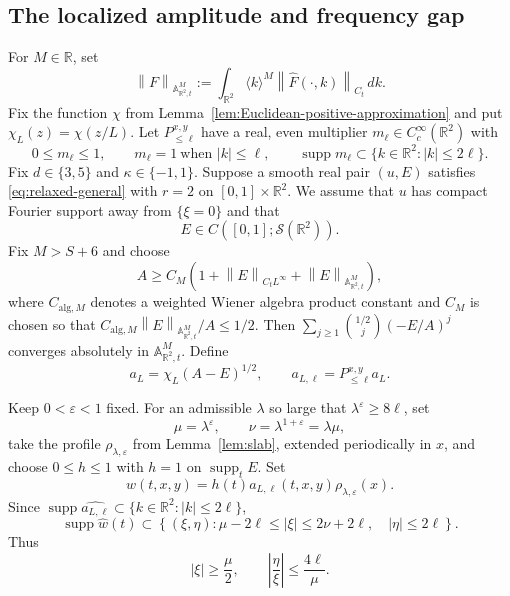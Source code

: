 \documentclass[12pt,reqno,letterpaper]{amsart}
\numberwithin{equation}{section}
\theoremstyle{definition}
\newcommand{\R}{\mathbb R}
\newcommand{\A}{\mathbb A}
\newcommand{\eps}{\varepsilon}
\newcommand{\la}{\lambda}
\newcommand{\supp}{\operatorname{supp}}
\newcommand{\norm}[1]{\left\lVert #1\right\rVert}
\newcommand{\abs}[1]{\left\lvert #1\right\rvert}
\begin{document}
\subsection{The localized amplitude and frequency gap}

For $M\in\R$, set
\[
    \norm{F}_{\A^M_{\R^2,t}}
    :=\int_{\R^2}\langle k\rangle^M
      \norm{\widehat F(\cdot,k)}_{C_t}\,dk.
\]
Fix the function $\chi$ from
Lemma~\ref{lem:Euclidean-positive-approximation} and put
$\chi_L(z)=\chi(z/L)$.
Let $P_{\leq\ell}^{x,y}$ have a real, even multiplier
$m_\ell\in C_c^\infty(\R^2)$ with
\begin{equation*}
    0\leq m_\ell\leq1,
    \qquad m_\ell=1\ \text{when }\abs k\leq\ell,
    \qquad \supp m_\ell\subset\{k\in\R^2:\abs k\leq2\ell\}.
\end{equation*}
Fix $d\in\{3,5\}$ and $\kappa\in\{-1,1\}$.  Suppose a smooth real pair
$(u,E)$ satisfies \eqref{eq:relaxed-general} with $r=2$
on $[0,1]\times\R^2$.  We assume that $u$ has compact Fourier support away
from $\{\xi=0\}$ and that
\[
    E\in C([0,1];\mathcal S(\R^2)).
\]
Fix $M>S+6$ and choose
\begin{equation}\label{eq:Euclidean-A-choice}
    A\geq C_M\left(1+\norm{E}_{C_tL^\infty}
                    +\norm{E}_{\A^M_{\R^2,t}}\right),
\end{equation}
where $C_{\mathrm{alg},M}$ denotes a weighted Wiener algebra product
constant and $C_M$ is chosen so that
$C_{\mathrm{alg},M}\norm{E}_{\A^M_{\R^2,t}}/A\leq1/2$.
Then
$\sum_{j\geq1}\binom{1/2}{j}(-E/A)^j$ converges absolutely in
$\A^M_{\R^2,t}$.  Define
\begin{equation}\label{eq:Euclidean-amplitude}
    a_L=\chi_L(A-E)^{1/2},
    \qquad a_{L,\ell}=P_{\leq\ell}^{x,y}a_L.
\end{equation}

Keep $0<\eps<1$ fixed.  For an admissible $\la$ so large that
$\la^\eps\geq8\ell$, set
\[
    \mu=\la^\eps,
    \qquad \nu=\la^{1+\eps}=\la\mu,
\]
take the profile $\rho_{\la,\eps}$ from Lemma~\ref{lem:slab}, extended
periodically in $x$, and choose $0\leq h\leq1$ with $h=1$ on
$\supp_tE$.  Set
\begin{equation}\label{eq:Euclidean-increment}
    w(t,x,y)=h(t)a_{L,\ell}(t,x,y)\rho_{\la,\eps}(x).
\end{equation}
Since $\supp\widehat{a_{L,\ell}}
\subset\{k\in\R^2:\abs k\leq2\ell\}$,
\begin{equation}\label{eq:Euclidean-cone}
    \supp\widehat w(t)\subset
    \left\{(\xi,\eta):
       \mu-2\ell\leq\abs\xi\leq2\nu+2\ell,
       \quad \abs\eta\leq2\ell
    \right\}.
\end{equation}
Thus
\begin{equation}\label{eq:Euclidean-cone-ratio}
    \abs\xi\geq\frac\mu2,
    \qquad \abs{\frac\eta\xi}\leq\frac{4\ell}{\mu}.
\end{equation}
\end{document}
